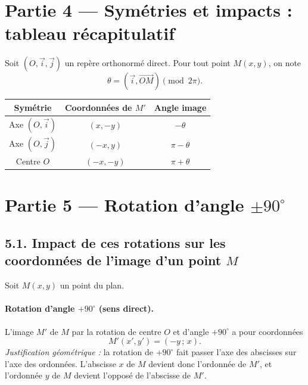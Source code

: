 \documentclass[11pt,a4paper]{article}
\begin{document}
\clearpage
\section*{Partie 4 — Symétries et impacts : tableau récapitulatif}

Soit $(O,\vec{i},\vec{j})$ un repère orthonormé direct. Pour tout point $M(x,y)$, on note
\[
\theta=\left(\vec{i},\overrightarrow{OM}\right)\pmod{2\pi}.
\]

\begin{center}
\begin{tabular}{|c|c|c|}
\hline
\textbf{Symétrie} & \textbf{Coordonnées de $M'$} & \textbf{Angle image} \\
\hline
Axe $(O,\vec{i})$ & $(x,-y)$ & $-\theta$ \\
\hline
Axe $(O,\vec{j})$ & $(-x,y)$ & $\pi-\theta$ \\
\hline
Centre $O$ & $(-x,-y)$ & $\pi+\theta$ \\
\hline
\end{tabular}
\end{center}

\clearpage
\section*{Partie 5 — Rotation d'angle $\pm 90^\circ$}

\subsection*{5.1. Impact de ces rotations sur les coordonnées de l'image d'un point $M$}

Soit $M(x,y)$ un point du plan.

\paragraph{Rotation d'angle $+90^\circ$ (sens direct).}

L'image $M'$ de $M$ par la rotation de centre $O$ et d'angle $+90^\circ$ a pour coordonnées
\[
M'(x',y')=(-y\,;\,x).
\]
\textit{Justification géométrique :} la rotation de $+90^\circ$ fait passer l'axe des abscisses sur l'axe des ordonnées. L'abscisse $x$ de $M$ devient donc l'ordonnée de $M'$, et l'ordonnée $y$ de $M$ devient l'opposé de l'abscisse de $M'$.
\end{document}

